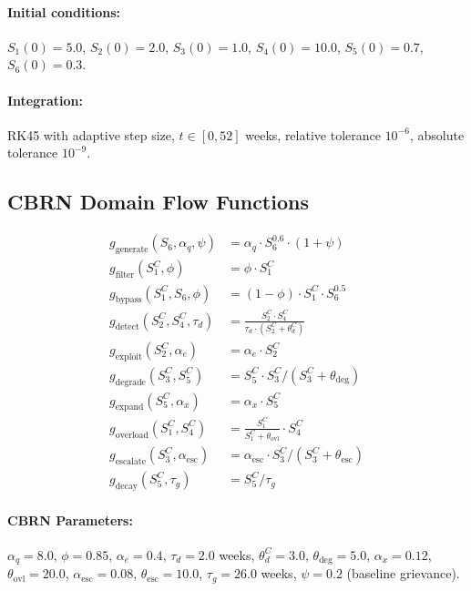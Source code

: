 \documentclass[11pt]{article}
\begin{document}
\paragraph{Initial conditions:}
$S_1(0) = 5.0$, $S_2(0) = 2.0$, $S_3(0) = 1.0$, $S_4(0) = 10.0$, $S_5(0) = 0.7$, $S_6(0) = 0.3$.

\paragraph{Integration:} RK45 with adaptive step size, $t \in [0, 52]$ weeks, relative tolerance $10^{-6}$, absolute tolerance $10^{-9}$.

\subsection{CBRN Domain Flow Functions}

\begin{align}
g_{\text{generate}}(S_6, \alpha_q, \psi) &= \alpha_q \cdot S_6^{0.6} \cdot (1 + \psi) \\
g_{\text{filter}}(S_1^C, \phi) &= \phi \cdot S_1^C \\
g_{\text{bypass}}(S_1^C, S_6, \phi) &= (1 - \phi) \cdot S_1^C \cdot S_6^{0.5} \\
g_{\text{detect}}(S_2^C, S_4^C, \tau_d) &= \frac{S_2^C \cdot S_4^C}{\tau_d \cdot (S_2^C + \theta_d^C)} \\
g_{\text{exploit}}(S_2^C, \alpha_e) &= \alpha_e \cdot S_2^C \\
g_{\text{degrade}}(S_3^C, S_5^C) &= S_5^C \cdot S_3^C / (S_3^C + \theta_{\text{deg}}) \\
g_{\text{expand}}(S_5^C, \alpha_x) &= \alpha_x \cdot S_5^C \\
g_{\text{overload}}(S_1^C, S_4^C) &= \frac{S_1^C}{S_1^C + \theta_{\text{ovl}}} \cdot S_4^C \\
g_{\text{escalate}}(S_3^C, \alpha_{\text{esc}}) &= \alpha_{\text{esc}} \cdot S_3^C / (S_3^C + \theta_{\text{esc}}) \\
g_{\text{decay}}(S_5^C, \tau_g) &= S_5^C / \tau_g
\end{align}

\paragraph{CBRN Parameters:}
$\alpha_q = 8.0$, $\phi = 0.85$, $\alpha_e = 0.4$, $\tau_d = 2.0$ weeks, $\theta_d^C = 3.0$, $\theta_{\text{deg}} = 5.0$, $\alpha_x = 0.12$, $\theta_{\text{ovl}} = 20.0$, $\alpha_{\text{esc}} = 0.08$, $\theta_{\text{esc}} = 10.0$, $\tau_g = 26.0$ weeks, $\psi = 0.2$ (baseline grievance).
\end{document}
